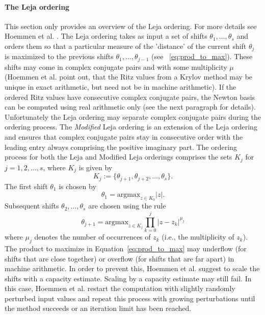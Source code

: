 \documentclass{scrartcl}
\numberwithin{equation}{section}
\begin{document}

\paragraph{The Leja ordering}
This section only provides an overview of the Leja ordering. For more details see Hoemmen et al. \cite{Hoemmen:2010:CKS:1970638}.
 The Leja ordering takes as input a set of shifts $\theta_1, \ldots, \theta_s$ and orders them so that a particular measure of the 'distance' of the current shift $\theta_j$ is maximized to the previous shifts $\theta_1, \ldots, \theta_{j - 1}$ (see ~\eqref{eq:prod_to_max}). These shifts may come in complex conjugate pairs and with some multiplicity $\mu$ (Hoemmen et al. \cite{Hoemmen:2010:CKS:1970638} point out, that the Ritz values from a Krylov method may be unique in exact arithmetic, but need not be in machine arithmetic). If the ordered Ritz values have consecutive complex conjugate pairs, the Newton basis can be computed using real arithmetic only (see the next paragraph for details). Unfortunately the Leja ordering may separate complex conjugate pairs during the ordering process. The \textit{Modified} Leja ordering is an extension of the Leja ordering and ensures that complex conjugate pairs stay in consecutive order with the leading entry always comprising the positive imaginary part. The ordering process for both the Leja and Modified Leja orderings comprises the sets $K_j$ for $j = 1,2, \ldots, s$, where $K_j$ is given by
\begin{equation}
K_j := \{\theta_{j + 1}, \theta_{j + 2}, \ldots, \theta_s\}.
\end{equation}
The first shift $\theta_1$ is chosen by
\begin{equation}
\theta_1 = \text{argmax}_{z \in K_0} |z|.
\end{equation}
Subsequent shifts $\theta_2, \ldots, \theta_s$ are chosen using the rule
\begin{equation}\label{eq:prod_to_max}
\theta_{j + 1} = \text{argmax}_{z \in K_j} \prod_{k = 0}^j |z - z_k|^{\mu_j}
\end{equation}
where $\mu_j$ denotes the number of occurrences of $z_k$ (i.e., the multiplicity of $z_k$).
The product to maximize in Equation~\eqref{eq:prod_to_max} may underflow (for shifts that are close together) or overflow (for shifts that are far apart) in machine arithmetic. In order to prevent this, Hoemmen et al. \cite{Hoemmen:2010:CKS:1970638} suggest to scale the shifts with a capacity estimate. Scaling by a capacity estimate may still fail. In this case, Hoemmen et al. restart the computation with slightly randomly perturbed input values and repeat this process with growing perturbations until the method succeeds or an iteration limit has been reached.
\end{document}
